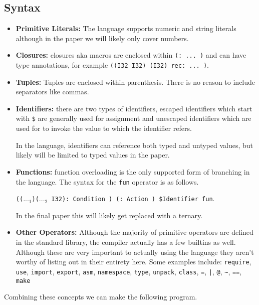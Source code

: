 \documentclass{article}
\begin{document}
\subsection{Syntax}
\begin{itemize}
    \item \textbf{Primitive Literals:} The language supports numeric and string literals although in the paper we will likely only cover numbers.

    \item \textbf{Closures:} closures aka macros are enclosed within \texttt{(: ... )} and can have type annotations, for example \texttt{((I32 I32) (I32) rec: ... )}.

    \item \textbf{Tuples:} Tuples are enclosed within parenthesis. There is no reason to include separators like commas.

    \item \textbf{Identifiers:} there are two types of identifiers, escaped identifiers which start with \texttt{\$} are generally used for assignment and unescaped identifiers which are used for to invoke the value to which the identifier refers.
    
    In the language, identifiers can reference both typed and untyped values, but likely will be limited to typed values in the paper.

    \item \textbf{Functions:} function overloading is the only supported form of branching in the language. The syntax for the \texttt{fun} operator is as follows. 

    \texttt{(($..._1$)($..._2$ I32): Condition ) (: Action ) \$Identifier fun}.

    In the final paper this will likely get replaced with a ternary.

    \item \textbf{Other Operators:} Although the majority of primitive operators are defined in the standard library, the compiler actually has a few builtins as well. Although these are very important to actually using the language they aren't worthy of listing out in their entirety here. Some examples include: \texttt{require}, \texttt{use}, \texttt{import}, \texttt{export}, \texttt{asm}, \texttt{namespace}, \texttt{type}, \texttt{unpack}, \texttt{class}, \texttt{=}, \texttt{|}, \texttt{@}, \texttt{\~}, \texttt{==}, \texttt{make}
\end{itemize}
    
    Combining these concepts we can make the following program.
    
\end{document}
